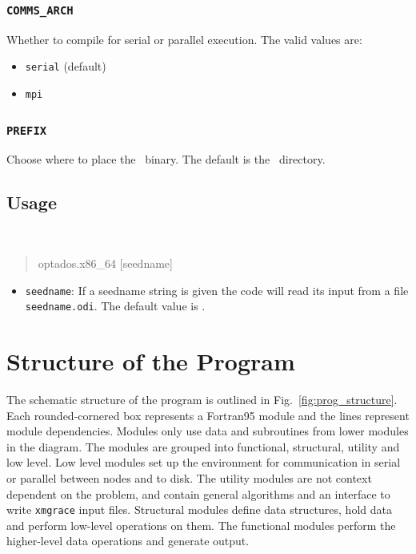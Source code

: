 \documentclass[a4paper,11pt,twoside]{book}
\begin{document}
{\subsection[comms_arch]{\tt COMMS\_ARCH}

Whether to compile for serial or parallel execution. The valid values are:
\begin{itemize}
\item[{\bf --}]  \verb#serial# (default)
\item[{\bf --}]  \verb#mpi#
\end{itemize}

\subsection[bin_dir]{\tt PREFIX}
Choose where to place the \optados\ binary. The default is the \optados\ directory.


\section{Usage}
{\tt
\begin{quote}
optados.x86\_64  [seedname]
\end{quote} }
\begin{itemize}
\item{  {\tt seedname}: If a seedname string is given the code will read its input from a file {\tt seedname.odi}. The default value is \castep.}
\end{itemize}


\chapter{Structure of the Program} \label{sec:structure}
The schematic structure of the program is outlined in Fig.~\ref{fig:prog_structure}.
%
Each rounded-cornered box represents a Fortran95 module and the lines represent module dependencies.
%
Modules only use data and subroutines from lower modules in the diagram.
%
The modules are grouped into functional, structural, utility and low level.
%
Low level modules set up the environment for communication in serial or parallel between nodes and to disk.
%
The utility modules are not context dependent on the problem, and contain general algorithms and an interface to write \texttt{xmgrace} input files.
%
Structural modules define data structures, hold data and perform low-level operations on them.
%
The functional modules perform the higher-level data operations and generate output.

}
\end{document}
